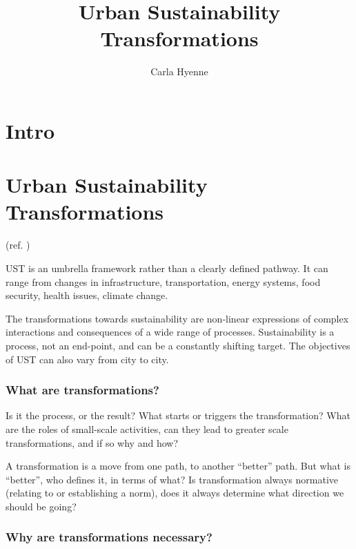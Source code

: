 \documentclass{article}
\title{Urban Sustainability Transformations}
\author{Carla Hyenne}
\begin{document}
\maketitle

\tableofcontents

\pagebreak
\section{Intro}

\section{Urban Sustainability Transformations}

(ref. \cite{mcphearson2021radical})

UST is an umbrella framework rather than a clearly defined pathway. It can range from changes in infrastructure, transportation, energy systems, food security, health issues, climate change. 

The transformations towards sustainability are non-linear expressions of complex interactions and consequences of a wide range of processes. Sustainability is a process, not an end-point, and can be a constantly shifting target.
The objectives of UST can also vary from city to city.

\subsubsection{What are transformations?}

Is it the process, or the result? What starts or triggers the transformation? What are the roles of small-scale activities, can they lead to greater scale transformations, and if so why and how?

A transformation is a move from one path, to another ``better'' path. But what is ``better'', who defines it, in terms of what? Is transformation always normative (relating to or establishing a norm), does it always determine what direction we should be going?

\subsubsection{Why are transformations necessary?}
\end{document}
